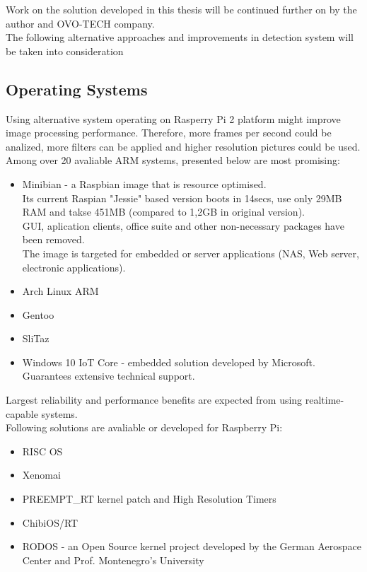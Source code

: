 \documentclass[12pt,twoside,a4paper]{article}
\begin{document}
Work on the solution developed in this thesis will be continued further on by the author and OVO-TECH company.\\
The following alternative approaches and improvements in detection system will be taken into consideration
\subsection{Operating Systems}
Using alternative system operating on Rasperry Pi 2 platform might improve image processing performance. Therefore, more frames per second could be analized, more filters can be applied and higher resolution pictures could be used.
Among over 20 avaliable ARM systems, presented below are most promising:
\begin{itemize}
  \item Minibian - a Raspbian image that is resource optimised.\\
  Its current Raspian "Jessie" based version boots in 14secs, use only 29MB RAM and takse 451MB (compared to 1,2GB in original version). \\GUI, aplication clients, office suite and other non-necessary packages have been removed.\\ The image is targeted for embedded or server applications (NAS, Web server, electronic applications).
  \item Arch Linux ARM
  \item Gentoo
  \item SliTaz
  \item Windows 10 IoT Core - embedded solution developed by Microsoft. Guarantees extensive technical support.
\end{itemize}

Largest reliability and performance benefits are expected from using realtime-capable systems.\\
Following solutions are avaliable or developed for Raspberry Pi:

\begin{itemize}
  \item RISC OS
  \item Xenomai
  \item PREEMPT\_RT kernel patch and High Resolution Timers\cite{stackos}
  \item ChibiOS/RT\cite{chibi}
  \item RODOS - an Open Source kernel project developed by the German Aerospace Center and Prof. Montenegro's University\cite{rodos}
\end{itemize}
\end{document}
